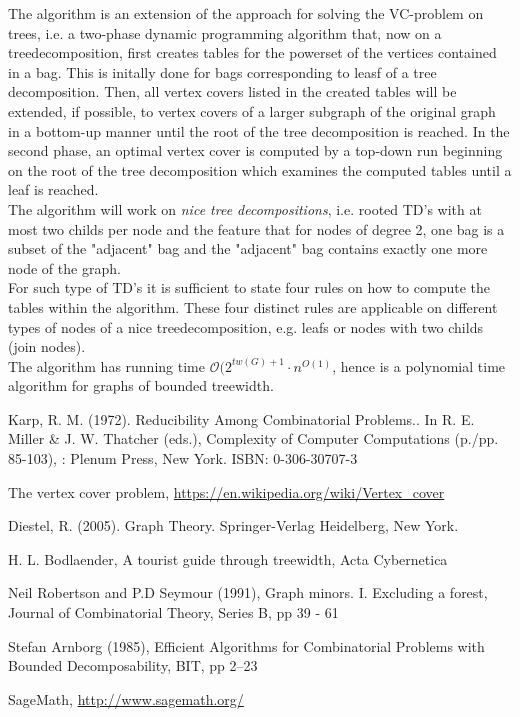 \documentclass[11pt,a4paper]{article}
\begin{document}
The algorithm is an extension of the approach for solving the VC-problem on trees, i.e. a two-phase dynamic programming algorithm that, now on a treedecomposition, first creates tables for the powerset of the vertices contained in a bag. This is initally done for bags corresponding to leasf of a tree decomposition. Then, all vertex covers listed in the created tables will be extended, if possible, to vertex covers of a larger subgraph of the original graph in a bottom-up manner until the root of the tree decomposition is reached. In the second phase, an optimal vertex cover is computed by a top-down run beginning on the root of the tree decomposition which examines the computed tables until a leaf is reached. \\
The algorithm will work on \emph{nice tree decompositions}, i.e. rooted TD's with at most two childs per node and the feature that for nodes of degree 2, one bag is a subset of the "adjacent" bag and the "adjacent" bag contains exactly one more node of the graph. \\
For such type of TD's it is sufficient to state four rules on how to compute the tables within the algorithm. These four distinct rules are applicable on different types of nodes of a nice  treedecomposition, e.g. leafs or nodes with two childs (join nodes). \\
The algorithm has running time $\mathcal{O}(2^{tw(G)+1} \cdot n^{O(1)}$, hence is a polynomial time algorithm for graphs of bounded treewidth. \\ 



\begin{thebibliography}{9}

 Karp, R. M. (1972). Reducibility Among Combinatorial Problems.. In R. E. Miller \& J. W. Thatcher (eds.), Complexity of Computer Computations (p./pp. 85-103), : Plenum Press, New York. ISBN: 0-306-30707-3

 The vertex cover problem, \url{https://en.wikipedia.org/wiki/Vertex_cover}

 Diestel, R. (2005). Graph Theory. Springer-Verlag Heidelberg, New York. 

 H. L. Bodlaender, A tourist guide through treewidth, Acta Cybernetica

 Neil Robertson and P.D Seymour (1991), Graph minors. I. Excluding a forest, Journal of Combinatorial Theory, Series B, pp 39 - 61

 Stefan Arnborg (1985), Efficient Algorithms for Combinatorial Problems with Bounded Decomposability, BIT, pp 2--23

 SageMath, \url{http://www.sagemath.org/}

\end{thebibliography}
\end{document}

